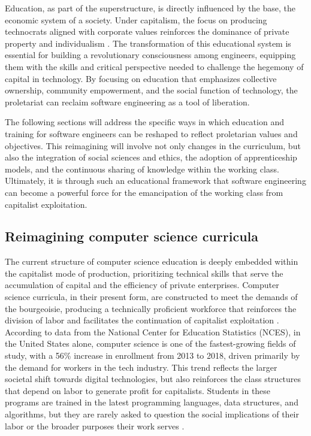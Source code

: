 \begin{refsection}
Education, as part of the superstructure, is directly influenced by the base, the economic system of a society. Under capitalism, the focus on producing technocrats aligned with corporate values reinforces the dominance of private property and individualism \cite[pp.~40]{marx1959manifesto}. The transformation of this educational system is essential for building a revolutionary consciousness among engineers, equipping them with the skills and critical perspective needed to challenge the hegemony of capital in technology. By focusing on education that emphasizes collective ownership, community empowerment, and the social function of technology, the proletariat can reclaim software engineering as a tool of liberation.

The following sections will address the specific ways in which education and training for software engineers can be reshaped to reflect proletarian values and objectives. This reimagining will involve not only changes in the curriculum, but also the integration of social sciences and ethics, the adoption of apprenticeship models, and the continuous sharing of knowledge within the working class. Ultimately, it is through such an educational framework that software engineering can become a powerful force for the emancipation of the working class from capitalist exploitation.

\subsection{Reimagining computer science curricula}

The current structure of computer science education is deeply embedded within the capitalist mode of production, prioritizing technical skills that serve the accumulation of capital and the efficiency of private enterprises. Computer science curricula, in their present form, are constructed to meet the demands of the bourgeoisie, producing a technically proficient workforce that reinforces the division of labor and facilitates the continuation of capitalist exploitation \cite[pp.~342]{marx2008capital}. According to data from the National Center for Education Statistics (NCES), in the United States alone, computer science is one of the fastest-growing fields of study, with a 56\% increase in enrollment from 2013 to 2018, driven primarily by the demand for workers in the tech industry. This trend reflects the larger societal shift towards digital technologies, but also reinforces the class structures that depend on labor to generate profit for capitalists. Students in these programs are trained in the latest programming languages, data structures, and algorithms, but they are rarely asked to question the social implications of their labor or the broader purposes their work serves \cite[pp.~72]{braverman1974labor}.


\end{refsection}
